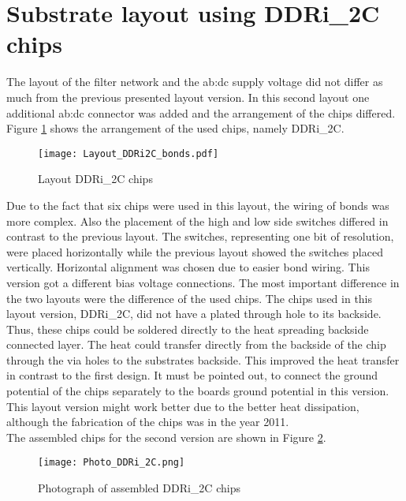 \section{Substrate layout using DDRi\_2C chips}
The layout of the filter network and the \gls{ab:dc} supply voltage did not differ as much from the previous presented layout version.
In this second layout one additional \gls{ab:dc} connector was added and the arrangement of the chips differed.
Figure \ref{fig:layoutDDRi2Cbond} shows the arrangement of the used chips, namely DDRi\_2C.


\begin{figure}[htb!]
	\centering
  \texttt{[image: Layout\_DDRi2C\_bonds.pdf]}
	\caption{Layout DDRi\_2C chips}
	\label{fig:layoutDDRi2Cbond}
\end{figure}

Due to the fact that six chips were used in this layout, the wiring of bonds was more complex.
Also the placement of the high and low side switches differed in contrast to the previous layout.
The switches, representing one bit of resolution, were placed horizontally while the previous layout showed the switches placed vertically.
Horizontal alignment was chosen due to easier bond wiring.
This version got a different bias voltage connections.
The most important difference in the two layouts were the difference of the used chips.
The chips used in this layout version, DDRi\_2C, did not have a plated through hole to its backside.
Thus, these chips could be soldered directly to the heat spreading backside connected layer.
The heat could transfer directly from the backside of the chip through the via holes to the substrates backside.
This improved the heat transfer in contrast to the first design.
It must be pointed out, to connect the ground potential of the chips separately to the boards ground potential in this version.
This layout version might work better due to the better heat dissipation, although the fabrication of the chips was in the year 2011.\\
The assembled chips for the second version are shown in Figure \ref{fig:photoDDRi2Cbond}.

\begin{figure}[htb!] %
	\centering
  \texttt{[image: Photo\_DDRi\_2C.png]}
	\caption{Photograph of assembled DDRi\_2C chips}
	\label{fig:photoDDRi2Cbond}
\end{figure}

